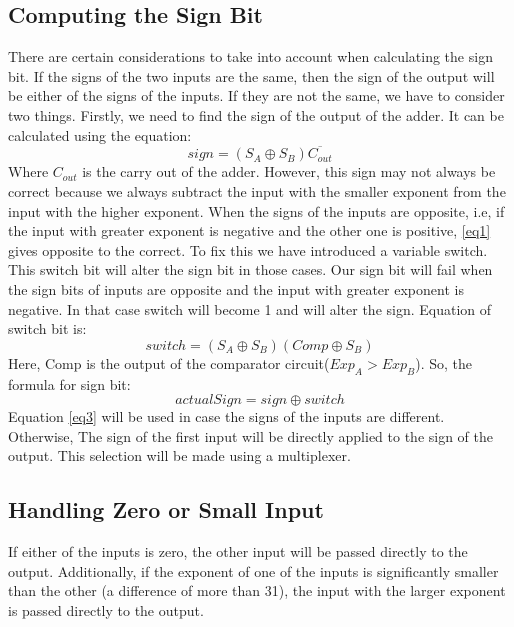 \documentclass[12pt]{article}
\begin{document}
\subsection{Computing the Sign Bit}
There are certain considerations to take into account when calculating the sign bit. If the signs of the two inputs are the same, then the sign of the output will be either of the signs of the inputs.
If they are not the same, we have to consider two things. Firstly, we need to find the sign of the output of the adder. It can be calculated using the equation:
\begin{equation}
sign = (S_A \oplus S_B)\overline{C_{out}}
\label{eq1}
\end{equation}
Where $C_{out}$ is the carry out of the adder.
However, this sign may not always be correct because we always subtract the input with the smaller exponent from the input with the higher exponent. When the signs of the inputs are opposite, i.e, if the input with greater exponent is negative and the other one is positive, \ref{eq1} gives opposite to the correct. To fix this we have introduced a variable switch. This switch bit will alter the sign bit in those cases. Our sign bit will fail when the sign bits of inputs are opposite and the input with greater exponent is negative. In that case switch will become 1 and will alter the sign. Equation of switch bit is:
\begin{equation}
switch = (S_A \oplus S_B)(Comp \oplus S_B)
\label{eq2}
\end{equation}
Here, Comp is the output of the comparator circuit($Exp_{A} > Exp_{B}$). So, the formula for sign bit:
\begin{equation}
actualSign = sign \oplus switch 
\label{eq3}
\end{equation}
Equation \ref{eq3} will be used in case the signs of the inputs are different. Otherwise, The sign of the first input will be directly applied to the sign of the output. This selection will be made using a multiplexer.

\subsection{Handling Zero or Small Input}
\label{zero}
If either of the inputs is zero, the other input will be passed directly to the output. Additionally, if the exponent of one of the inputs is significantly smaller than the other (a difference of more than 31), the input with the larger exponent is passed directly to the output.
\end{document}
